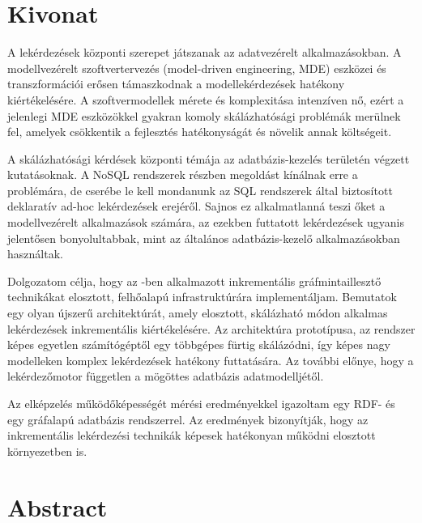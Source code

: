 \chapter*{Kivonat}

A lekérdezések központi szerepet játszanak az adatvezérelt alkalmazásokban. A modellvezérelt szoftvertervezés (model-driven engineering, MDE) eszközei és transzformációi erősen támaszkodnak a modellekérdezések hatékony kiértékelésére. A szoftvermodellek mérete és komplexitása intenzíven nő, ezért a jelenlegi MDE eszközökkel gyakran komoly skálázhatósági problémák merülnek fel, amelyek csökkentik a fejlesztés hatékonyságát és növelik annak költségeit.

A skálázhatósági kérdések központi témája az adatbázis-kezelés területén végzett kutatásoknak. A NoSQL rendszerek részben megoldást kínálnak erre a problémára, de cserébe le kell mondanunk az SQL rendszerek által biztosított deklaratív ad-hoc lekérdezések erejéről. Sajnos ez alkalmatlanná teszi őket a modellvezérelt alkalmazások számára, az ezekben futtatott lekérdezések ugyanis jelentősen bonyolultabbak, mint az általános adatbázis-kezelő alkalmazásokban használtak.

Dolgozatom célja, hogy az \eiq{}-ben alkalmazott inkrementális gráfmintaillesztő technikákat elosztott, felhőalapú infrastruktúrára implementáljam. Bemutatok egy olyan újszerű architektúrát, amely elosztott, skálázható módon alkalmas lekérdezések inkrementális kiértékelésére. Az architektúra prototípusa, az \iqd{} rendszer képes egyetlen számítógéptől egy többgépes fürtig skálázódni, így képes nagy modelleken komplex lekérdezések hatékony futtatására. Az \iqd{} további előnye, hogy a lekérdezőmotor független a mögöttes adatbázis adatmodelljétől.

Az elképzelés működőképességét mérési eredményekkel igazoltam egy RDF- és egy gráfalapú adatbázis rendszerrel. Az eredmények bizonyítják, hogy az inkrementális lekérdezési technikák képesek hatékonyan működni elosztott környezetben is. 

\vfill

\chapter*{Abstract}

